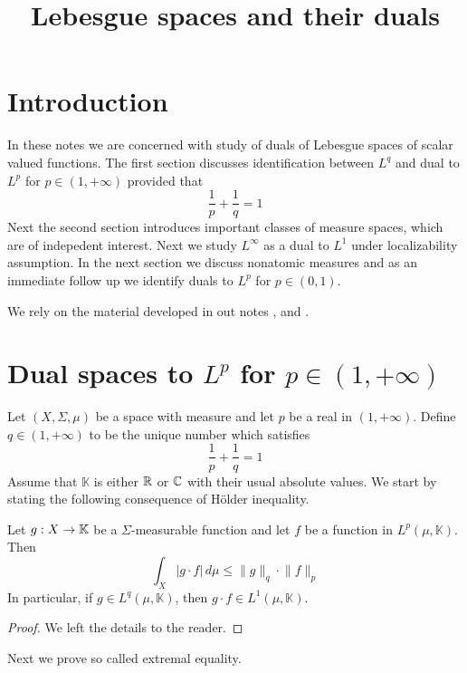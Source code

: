 



\title{Lebesgue spaces and their duals}
\date{}
\maketitle


\section{Introduction}
\noindent
In these notes we are concerned with study of duals of Lebesgue spaces of scalar valued functions. The first section discusses identification between $L^q$ and dual to $L^p$ for $p\in (1,+\infty)$ provided that
$$\frac{1}{p} + \frac{1}{q} = 1$$
Next the second section introduces important classes of measure spaces, which are of indepedent interest.  Next we study $L^{\infty}$ as a  dual to $L^1$ under localizability assumption. In the next section we discuss nonatomic measures and as an immediate follow up we identify duals to $L^p$ for $p \in (0,1)$. 

We rely on the material developed in out notes \cite{Introduction_to_measure_theory}, \cite{Integration} and \cite{Radon_Nikodym_Hahn_Jordan_Lebesgue_decomposition}.


\section{Dual spaces to $L^p$ for $p \in (1,+\infty)$}
\noindent
Let $(X,\Sigma,\mu)$ be a space with measure and let $p$ be a real in $(1,+\infty)$. Define $q \in (1,+\infty)$ to be the unique number which satisfies
$$\frac{1}{p} + \frac{1}{q} = 1$$
Assume that $\mathbb{K}$ is either ${\mathbb R}$ or ${\mathbb C}$ with their usual absolute values. We start by stating the following consequence of H{\"o}lder inequality.

\begin{proposition}\label{proposition:consequences_of_Holder_inequality}
  Let $g:X \rightarrow \mathbb{K}$ be a $\Sigma$-measurable function and let $f$ be a function in $L^p(\mu,\mathbb{K})$. Then 
  $$\int_X |g\cdot f|\,d\mu \leq \lVert g\rVert_q \cdot \lVert f\rVert_p$$
  In particular, if $g \in L^q(\mu,\mathbb{K})$, then $g\cdot f \in L^1(\mu,\mathbb{K})$.
\end{proposition}
\begin{proof}
  We left the details to the reader.
\end{proof}
\noindent
Next we prove so called extremal equality.

